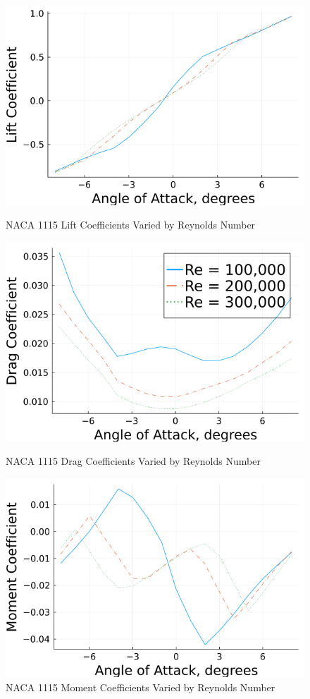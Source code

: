 \documentclass{article}
\begin{document}
\begin{figure}[!htb]
  \includegraphics[width=\linewidth]{Figure10.png}
  \caption{NACA 1115 Lift Coefficients Varied by Reynolds Number}\label{fig:10}
\endminipage\hfill
{}
  \includegraphics[width=\linewidth]{Figure11.png}
  \caption{NACA 1115 Drag Coefficients Varied by Reynolds Number}\label{fig:11}
\endminipage\hfill
{}
  \includegraphics[width=\linewidth]{Figure12.png}
  \caption{NACA 1115 Moment Coefficients Varied by Reynolds Number}\label{fig:12}
\endminipage
\end{figure}
\end{document}
